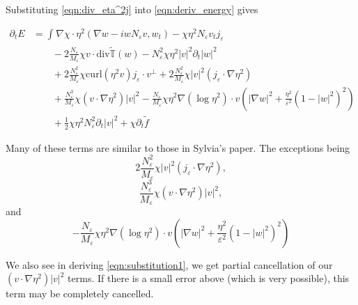 \documentclass[a4paper]{article}
\newcommand{\curl}{\mathrm{curl}}
\renewcommand{\div}{\mathrm{div}}
\begin{document}
Substituting \eqref{eqn:div_eta^2j} into \eqref{eqn:deriv_energy} gives

\begin{align}
  \partial_t E &= \int_{}^{} \nabla \chi \cdot \eta^2 ( \nabla w - i w N_\varepsilon v, w_t) - \chi \eta^2 N_\varepsilon v_t j_\varepsilon \nonumber
  \\
  &\quad \quad -2 \frac{N_\varepsilon}{M_\varepsilon} \chi v \cdot \div \tilde{\mathbb{T}}(w) -
  N_\varepsilon^2 \chi \eta^2 |v|^2 \partial_t |w|^2  \nonumber \\
  &\quad \quad+ 2 \frac{N_\varepsilon^2}{M_\varepsilon} \chi \curl(\eta^2 v) j_\varepsilon \cdot v^\perp + 2 \frac{N_\varepsilon^2}{M_\varepsilon} \chi
  |v|^2 (j_\varepsilon \cdot \nabla \eta^2) \nonumber \\
  &\quad \quad + \frac{N_\varepsilon^3}{M_\varepsilon} \chi (v \cdot \nabla \eta^2) |v|^2 - \frac{N_\varepsilon}{M_\varepsilon} \chi \eta^2 \nabla(
  \log \eta^2 ) \cdot v \left( | \nabla w |^2 + \frac{\eta^2}{\varepsilon^2} (1-|w|^2)^2 \right) \nonumber \\
  &\quad \quad + \frac{1}{2} \chi \eta^2 N_\varepsilon^2 \partial_t |v|^2 + \chi \partial_t \tilde{f}
  \label{eqn:deriv_energy2}
\end{align}

Many of these terms are similar to those in Sylvia's paper. The exceptions being
\[ 2 \frac{N_\varepsilon^2}{M_\varepsilon} \chi |v|^2 (j_\varepsilon \cdot \nabla \eta^2) , \]
\[ \frac{N_\varepsilon^3}{M_\varepsilon} \chi (v \cdot \nabla \eta^2) |v|^2 , \]
and
\[ - \frac{N_\varepsilon}{M_\varepsilon} \chi \eta^2 \nabla ( \log \eta^2 ) \cdot v \left( | \nabla w |^2 + \frac{\eta^2}{\varepsilon^2} ( 1-|w|^2)^2
\right) \]

We also see in deriving \eqref{eqn:substitution1}, we get partial cancellation of our $ (v \cdot \nabla \eta^2) |v|^2$ terms. If there is a small
error above (which is very possible), this term may be completely cancelled.
\end{document}
